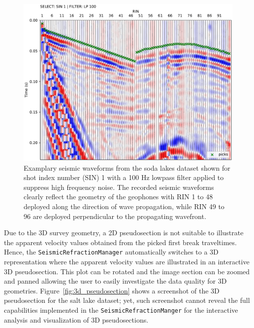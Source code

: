 \documentclass[a4paper,fleqn]{cas-sc}
\begin{document}
\begin{figure}
	\centering
	\includegraphics[width=.75\textwidth]{figures/sodalakes_sin1_lp100_picks_vd.pdf}
	\caption{Examplary seismic waveforms from the soda lakes dataset shown for shot index number (SIN) 1 with a 100 Hz lowpass filter applied to suppress high frequency noise. The recorded seismic waveforms clearly reflect the geometry of the geophones with RIN 1 to 48 deployed along the direction of wave propagation, while RIN 49 to 96 are deployed perpendicular to the propagating wavefront.}
	\label{fig:3d_pickwindow}
\end{figure}

Due to the 3D survey geometry, a 2D pseudosection is not suitable 
to illustrate the apparent velocity values obtained from the picked first break traveltimes. Hence, 
the \texttt{SeismicRefractionManager} automatically switches to a 3D representation where the apparent velocity values are illustrated in an interactive 3D pseudosection. This plot can be rotated and the image section can be zoomed and panned allowing the user to easily investigate the data quality for 3D geometries. Figure~\ref{fig:3d_pseudosection} shows a screenshot of the 3D pseudosection for the salt lake dataset; yet, such screenshot cannot reveal the full capabilities implemented in the \texttt{SeismicRefractionManger} for the interactive analysis and visualization of 3D pseudosections.
\end{document}
